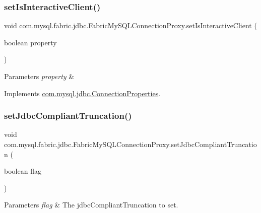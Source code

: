 \subsubsection{\texorpdfstring{set\+Is\+Interactive\+Client()}{setIsInteractiveClient()}}
{\footnotesize\ttfamily void com.\+mysql.\+fabric.\+jdbc.\+Fabric\+My\+S\+Q\+L\+Connection\+Proxy.\+set\+Is\+Interactive\+Client (\begin{DoxyParamCaption}\item[{boolean}]{property }\end{DoxyParamCaption})}


\begin{DoxyParams}{Parameters}
{\em property} & \\
\hline
\end{DoxyParams}


Implements \mbox{\hyperlink{interfacecom_1_1mysql_1_1jdbc_1_1_connection_properties_a8157f1dda8d47aca668811bb7c932ec0}{com.\+mysql.\+jdbc.\+Connection\+Properties}}.

\mbox{\label{classcom_1_1mysql_1_1fabric_1_1jdbc_1_1_fabric_my_s_q_l_connection_proxy_a24963d3cf82b5ec8579ba3e5a75fbb8b}} 
\subsubsection{\texorpdfstring{set\+Jdbc\+Compliant\+Truncation()}{setJdbcCompliantTruncation()}}
{\footnotesize\ttfamily void com.\+mysql.\+fabric.\+jdbc.\+Fabric\+My\+S\+Q\+L\+Connection\+Proxy.\+set\+Jdbc\+Compliant\+Truncation (\begin{DoxyParamCaption}\item[{boolean}]{flag }\end{DoxyParamCaption})}


\begin{DoxyParams}{Parameters}
{\em flag} & The jdbc\+Compliant\+Truncation to set. \\
\hline
\end{DoxyParams}


